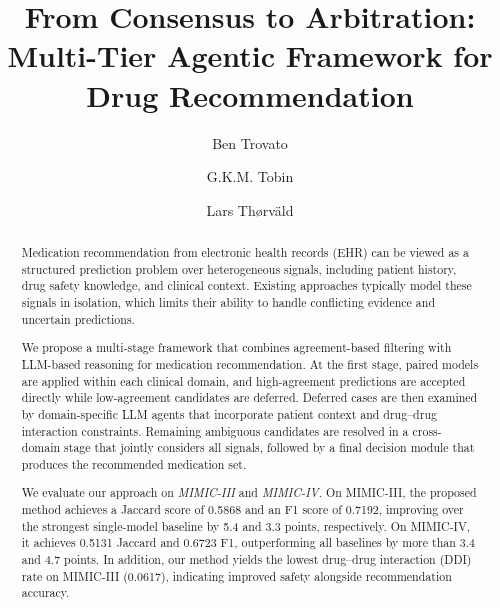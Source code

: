 \documentclass[sigconf,anonymous]{acmart}
\begin{document}
\title{From Consensus to Arbitration: Multi-Tier Agentic Framework for Drug Recommendation}

\author{Ben Trovato}
\author{G.K.M. Tobin}
\authornotemark[1]

\author{Lars Th{\o}rv{\"a}ld}

\renewcommand{\shortauthors}{Trovato et al.}

\begin{abstract}
Medication recommendation from electronic health records (EHR) can be viewed as a structured prediction problem over heterogeneous signals, including patient history, drug safety knowledge, and clinical context. Existing approaches typically model these signals in isolation, which limits their ability to handle conflicting evidence and uncertain predictions.

We propose a multi-stage framework that combines agreement-based filtering with LLM-based reasoning for medication recommendation. At the first stage, paired models are applied within each clinical domain, and high-agreement predictions are accepted directly while low-agreement candidates are deferred. Deferred cases are then examined by domain-specific LLM agents that incorporate patient context and drug--drug interaction constraints. Remaining ambiguous candidates are resolved in a cross-domain stage that jointly considers all signals, followed by a final decision module that produces the recommended medication set.

We evaluate our approach on \textit{MIMIC-III} and \textit{MIMIC-IV}. On MIMIC-III, the proposed method achieves a Jaccard score of 0.5868 and an F1 score of 0.7192, improving over the strongest single-model baseline by 5.4 and 3.3 points, respectively. On MIMIC-IV, it achieves 0.5131 Jaccard and 0.6723 F1, outperforming all baselines by more than 3.4 and 4.7 points. In addition, our method yields the lowest drug--drug interaction (DDI) rate on MIMIC-III (0.0617), indicating improved safety alongside recommendation accuracy.
\end{abstract}

\end{document}
